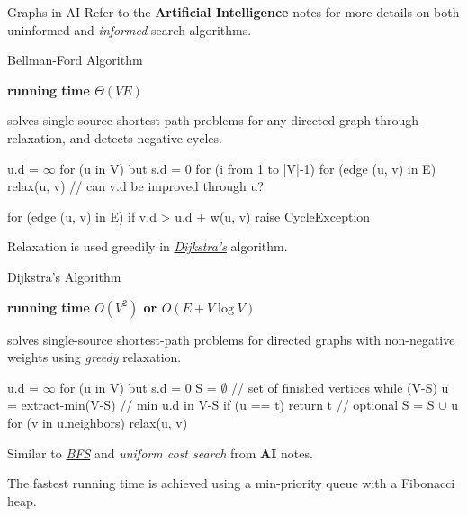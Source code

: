 \documentclass{cognito}
\begin{document}

\begin{note}{Graphs in AI}
	Refer to the \textbf{Artificial Intelligence} \noteref notes for more details on both uninformed and \emph{informed} search
	algorithms.
	
\end{note}


\begin{note}{Bellman-Ford Algorithm}
	\begin{mdframed}[linecolor=black!25!white]
		\bf running time $\Theta(V E)$
	\end{mdframed}
	 solves single-source shortest-path problems for any directed graph through relaxation, and detects negative cycles.
	\begin{largecode}
 u.d = $\infty$ for (u in V) but s.d = 0
 for (i from 1 to |V|-1)
	for (edge (u, v) in E)
		relax(u, v)  // can v.d be improved through u?

 for (edge (u, v) in E)
	if v.d > u.d + w(u, v) raise CycleException
	\end{largecode}
	\begin{remark} Relaxation is used greedily in \hyperref[note:Dijkstra's Algorithm]{\it Dijkstra's} algorithm.\end{remark}
	\vspace{-5pt}
\end{note}

\begin{note}{Dijkstra's Algorithm}
	\begin{mdframed}[linecolor=black!25!white]
		\bf running time $O(V^2)$ or $O(E + V \log V)$
	\end{mdframed}
	 solves single-source shortest-path problems for directed graphs with non-negative weights using \emph{greedy} relaxation.
		\begin{largecode}
 u.d = $\infty$ for (u in V) but s.d = 0
 S = $\emptyset$  // set of finished vertices
 while (V-S)
	u = extract-min(V-S)  // min u.d in V-S
	if (u == t) return t  // optional
	S = S $\cup$ { u }
	for (v in u.neighbors) relax(u, v)
	\end{largecode}
\begin{remark} Similar to \hyperref[note:Breadth-First Search]{\it BFS} and \emph{uniform cost search} from \textbf{AI} \noteref notes. \end{remark}
\begin{remark} The fastest running time is achieved using a min-priority queue with a Fibonacci heap. \end{remark}\vspace{-5pt}
\end{note}
\end{document}

